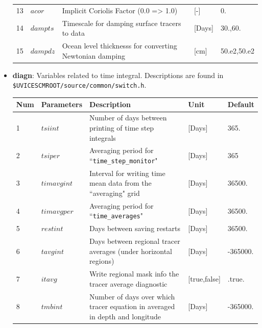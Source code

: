 \documentclass[a4paper]{article}
\begin{document}
\begin{itemize}
{\begin{longtable}{lllll}
  13   & $acor$             & Implicit Coriolis Factor (0.0 => 1.0)                                            & [-]                   & 0.    \\    
  14   & $dampts$           & Timescale for damping surface tracers to data                                    & [Days]                & 30.,60. \\
  15   & $dampdz$           & Ocean level thicknesss for converting Newtonian damping                          & [cm]                  & 50.e2,50.e2 \\ \hline
    \end{longtable}}
        
\item \textbf{diagn}: Variables related to time integral. Descriptions are found in \\ \verb|$UVICESCMROOT/source/common/switch.h|.
{\footnotesize
\begin{longtable}{lllll} \hline
  Num  & Parameters  & Description                                                                      & Unit               & Default    \\ \hline 
  1    & $tsiint$    & Number of days between printing of time step integrals                           & [Days]             & 365.     \\
  2    & $tsiper$    & Averaging period for ``\verb|time_step_monitor|"                                 & [Days]             & 365      \\
  3    & $timavgint$ & Interval for writing time mean data from the ``averaging" grid                   & [Days]             & 36500.   \\
  4    & $timavgper$ & Averaging period for ``\verb|time_averages|"                                     & [Days]             & 36500.   \\
  5    & $restint$   & Days between saving restarts                                                     & [Days]             & 36500.   \\
  6    & $tavgint$   & Days between regional tracer averages (under horizontal regions)                 & [Days]             & -365000. \\
  7    & $itavg$     & Write regional mask info the tracer average diagnostic                           & [true,false]       & .true.   \\
  8    & $tmbint$    & Number of days over which tracer equation in averaged in depth and longitude     & [Days]             & -365000.  \\

\end{longtable}}
\end{itemize}
\end{document}
